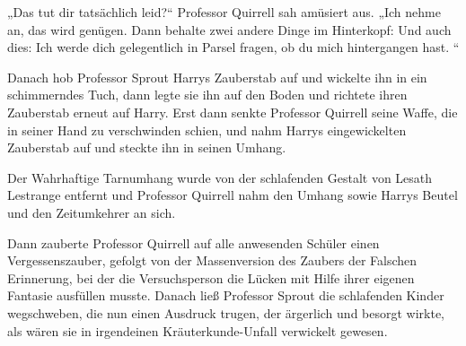 „Das tut dir tatsächlich leid?“
Professor Quirrell sah amüsiert aus.
„Ich nehme an, das wird genügen. Dann behalte zwei andere Dinge im Hinterkopf:  Und auch dies: Ich werde dich gelegentlich in Parsel fragen, ob du mich hintergangen hast. “

\later

Danach hob Professor Sprout Harrys Zauberstab auf und wickelte ihn in ein schimmerndes Tuch, dann legte sie ihn auf den Boden und richtete ihren Zauberstab erneut auf Harry. Erst dann senkte Professor Quirrell seine Waffe, die in seiner Hand zu verschwinden schien, und nahm Harrys eingewickelten Zauberstab auf und steckte ihn in seinen Umhang.

Der Wahrhaftige Tarnumhang wurde von der schlafenden Gestalt von Lesath Lestrange entfernt und Professor Quirrell nahm den Umhang sowie Harrys Beutel und den Zeitumkehrer an sich.

Dann zauberte Professor Quirrell auf alle anwesenden Schüler einen Vergessenszauber, gefolgt von der Massenversion des Zaubers der Falschen Erinnerung, bei der die Versuchsperson die Lücken mit Hilfe ihrer eigenen Fantasie ausfüllen musste. Danach ließ Professor Sprout die schlafenden Kinder wegschweben, die nun einen Ausdruck trugen, der ärgerlich und besorgt wirkte, als wären sie in irgendeinen Kräuterkunde-Unfall verwickelt gewesen.

